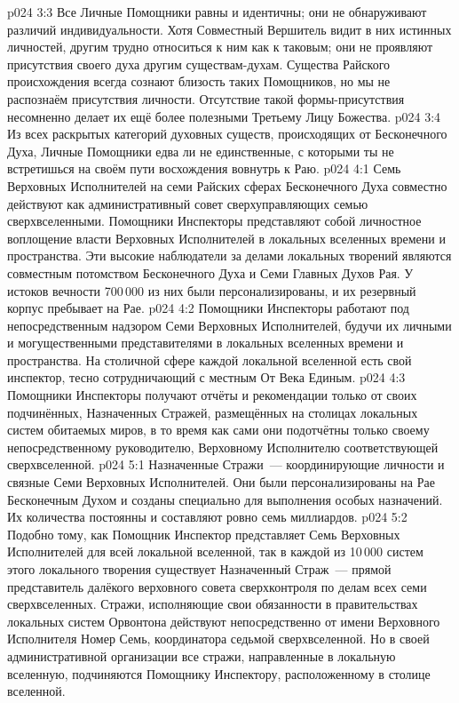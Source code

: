 \vs p024 3:3 Все Личные Помощники равны и идентичны; они не обнаруживают различий индивидуальности. Хотя Совместный Вершитель видит в них истинных личностей, другим трудно относиться к ним как к таковым; они не проявляют присутствия своего духа другим существам\hyp{}духам. Существа Райского происхождения всегда сознают близость таких Помощников, но мы не распознаём присутствия личности. Отсутствие такой формы\hyp{}присутствия несомненно делает их ещё более полезными Третьему Лицу Божества.
\vs p024 3:4 Из всех раскрытых категорий духовных существ, происходящих от Бесконечного Духа, Личные Помощники едва ли не единственные, с которыми ты не встретишься на своём пути восхождения вовнутрь к Раю.
\vs p024 4:1 Семь Верховных Исполнителей на семи Райских сферах Бесконечного Духа совместно действуют как административный совет сверхуправляющих семью сверхвселенными. Помощники Инспекторы представляют собой личностное воплощение власти Верховных Исполнителей в локальных вселенных времени и пространства. Эти высокие наблюдатели за делами локальных творений являются совместным потомством Бесконечного Духа и Семи Главных Духов Рая. У истоков вечности 700\,000 из них были персонализированы, и их резервный корпус пребывает на Рае.
\vs p024 4:2 Помощники Инспекторы работают под непосредственным надзором Семи Верховных Исполнителей, будучи их личными и могущественными представителями в локальных вселенных времени и пространства. На столичной сфере каждой локальной вселенной есть свой инспектор, тесно сотрудничающий с местным От Века Единым.
\vs p024 4:3 Помощники Инспекторы получают отчёты и рекомендации только от своих подчинённых, Назначенных Стражей, размещённых на столицах локальных систем обитаемых миров, в то время как сами они подотчётны только своему непосредственному руководителю, Верховному Исполнителю соответствующей сверхвселенной.
\vs p024 5:1 Назначенные Стражи~--- координирующие личности и связные Семи Верховных Исполнителей. Они были персонализированы на Рае Бесконечным Духом и созданы специально для выполнения особых назначений. Их количества постоянны и составляют ровно семь миллиардов.
\vs p024 5:2 Подобно тому, как Помощник Инспектор представляет Семь Верховных Исполнителей для всей локальной вселенной, так в каждой из 10\,000 систем этого локального творения существует Назначенный Страж~--- прямой представитель далёкого верховного совета сверхконтроля по делам всех семи сверхвселенных. Стражи, исполняющие свои обязанности в правительствах локальных систем Орвонтона действуют непосредственно от имени Верховного Исполнителя Номер Семь, координатора седьмой сверхвселенной. Но в своей административной организации все стражи, направленные в локальную вселенную, подчиняются Помощнику Инспектору, расположенному в столице вселенной.
